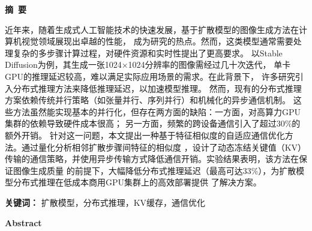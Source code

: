 \newpage
\begin{center}
    \bfseries {} 摘~要
\end{center}
\par

近年来，随着生成式人工智能技术的快速发展，基于扩散模型的图像生成方法在计算机视觉领域展现出卓越的性能，
成为研究的热点。然而，这类模型通常需要处理复杂的多步骤计算过程，对硬件资源和实时性提出了更高要求。
以Stable Diffusion为例，其生成一张1024×1024分辨率的图像需经过几十次迭代，
单卡GPU的推理延迟较高，难以满足实际应用场景的需求。在此背景下，
许多研究引入分布式推理方法来降低推理延迟，以加速模型推理。
然而，现有的分布式推理方案依赖传统并行策略（如张量并行、序列并行）和机械化的异步通信机制。
这些方法虽然能实现基本的并行化，但存在两方面的缺陷：一方面，对高算力GPU集群的依赖导致硬件成本很高；
另一方面，频繁的跨设备通信引入了超过30\%的额外开销。
针对这一问题，本文提出一种基于特征相似度的自适应通信优化方法。通过量化分析相邻扩散步骤间特征的相似度
，设计了动态冻结关键值（KV）传输的通信策略，并使用异步传输方式降低通信开销。实验结果表明，该方法在保证图像生成质量
的前提下，大幅降低分布式推理延迟（最高可达33\%），为扩散模型分布式推理在低成本商用GPU集群上的高效部署提供
了解决方案。

\noindent \textbf{关键词：} 扩散模型，分布式推理，KV缓存，通信优化

\newpage
\begin{center}
    \bfseries {} Abstract
\end{center}

